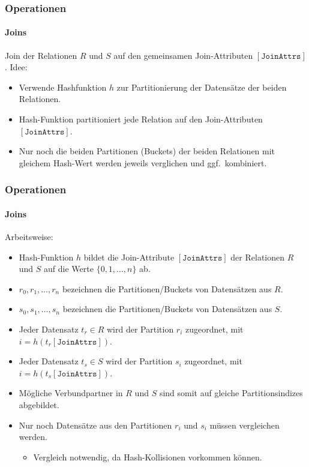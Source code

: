 \begin{frame}
	\frametitle{Operationen}
	\framesubtitle{Joins}
	\abs
  Join der Relationen $R$ und $S$ auf den gemeinsamen Join-Attributen $\mathtt{[JoinAttrs]}$.
  \pause
  \abs
	Idee:
	\begin{itemize}
		\item Verwende Hashfunktion $h$ zur Partitionierung der Datens\"atze der beiden Relationen.
		\item Hash-Funktion partitioniert jede Relation auf den Join-Attributen $\mathtt{[JoinAttrs]}$.
		\item Nur noch die beiden Partitionen (Buckets) der beiden Relationen mit gleichem Hash-Wert werden jeweils 
		verglichen und ggf.~kombiniert.
	\end{itemize}	
\end{frame}

\begin{frame}
\frametitle{Operationen}
\framesubtitle{Joins}
\abs
Arbeitsweise: 
\begin{itemize}
		\item Hash-Funktion $h$ bildet die Join-Attribute $\mathtt{[JoinAttrs]}$ der Relationen $R$ und $S$ auf die Werte 
		$\{0, 1, \dots, n\}$ ab.
		\pause
		\item $r_0, r_1, \dots, {r_n}$ bezeichnen die Partitionen/Buckets von Datens\"atzen aus $R$. 
		\item $s_0, s_1, \dots, {s_n}$ bezeichnen die Partitionen/Buckets von Datens\"atzen aus $S$. 
		\pause
		\item Jeder Datensatz $t_r \in R$ wird der Partition $r_i$ zugeordnet, mit $i = h(t_r\mathtt{[JoinAttrs]})$.
		\item Jeder Datensatz $t_s \in S$ wird der Partition $s_i$ zugeordnet, mit $i = h(t_s\mathtt{[JoinAttrs]})$.
		\pause
		\item M\"ogliche Verbundpartner in $R$ und $S$ sind somit auf gleiche Partitionsindizes abgebildet.
		\pause
		\item Nur noch Datens\"atze aus den Partitionen $r_i$ und $s_i$ m\"ussen vergleichen werden.
		\begin{itemize}
		 \item Vergleich notwendig, da Hash-Kollisionen vorkommen können.
		\end{itemize}
\end{itemize}	
\end{frame}


